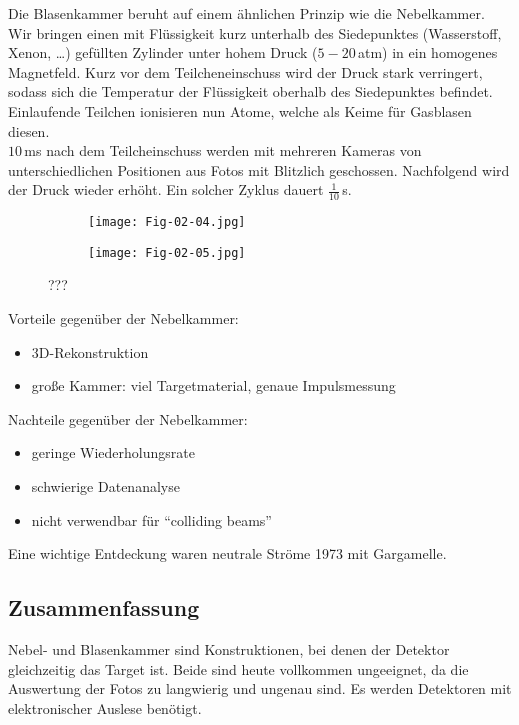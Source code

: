Die Blasenkammer beruht auf einem ähnlichen Prinzip wie die Nebelkammer. Wir bringen einen mit
Flüssigkeit kurz unterhalb des Siedepunktes (Wasserstoff, Xenon, \ldots) gefüllten Zylinder unter
hohem Druck ($5-20\,$atm) in ein homogenes Magnetfeld. Kurz vor dem Teilcheneinschuss wird der Druck
stark verringert, sodass sich die Temperatur der Flüssigkeit oberhalb des Siedepunktes befindet.
Einlaufende Teilchen ionisieren nun Atome, welche als Keime für Gasblasen diesen.
\\
$10\,$ms nach dem Teilcheinschuss werden mit mehreren Kameras von unterschiedlichen Positionen aus
Fotos mit Blitzlich geschossen. Nachfolgend wird der Druck wieder erhöht. Ein solcher Zyklus dauert
$\frac{1}{10}\,$s. %

\begin{figure}[htbp]
	\begin{minipage}[b]{0.5\textwidth}
		\begin{figure}[H]
		\centering
		\texttt{[image: Fig-02-04.jpg]}
		\end{figure}
	\end{minipage}
	\hfill
	\begin{minipage}[b]{0.5\textwidth}
		\begin{figure}[H]
		\centering
		\texttt{[image: Fig-02-05.jpg]}
		\end{figure}
	\end{minipage}
	\caption{???}
	\label{blasenkammer} 
\end{figure}

Vorteile gegenüber der Nebelkammer:

\begin{itemize}
  \item 3D-Rekonstruktion
  \item große Kammer: viel Targetmaterial, genaue Impulsmessung
\end{itemize}

Nachteile gegenüber der Nebelkammer:

\begin{itemize}
  \item geringe Wiederholungsrate
  \item schwierige Datenanalyse
  \item nicht verwendbar für "`colliding beams"'
\end{itemize}

Eine wichtige Entdeckung waren neutrale Ströme 1973 mit Gargamelle.

\subsection*{Zusammenfassung}

Nebel- und Blasenkammer sind Konstruktionen, bei denen der Detektor gleichzeitig das Target ist.
Beide sind heute vollkommen ungeeignet, da die Auswertung der Fotos zu langwierig und ungenau sind.
Es werden Detektoren mit elektronischer Auslese benötigt.
